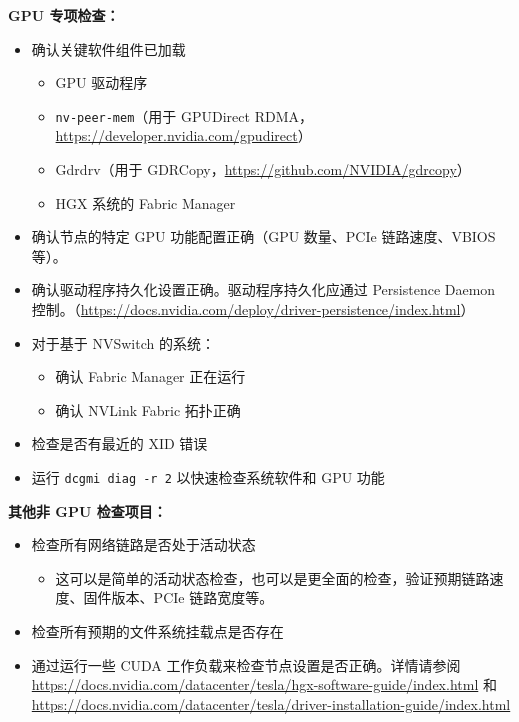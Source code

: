 \documentclass[11pt,UTF8,fontset=fandol,openany]{ctexrep}
\begin{document}
\vspace{0.5em}
\noindent\textbf{GPU 专项检查：}

\begin{itemize}
  \item 确认关键软件组件已加载
  \begin{itemize}
    \item GPU 驱动程序
    \item \texttt{nv-peer-mem}（用于 GPUDirect RDMA，\url{https://developer.nvidia.com/gpudirect}）
    \item Gdrdrv（用于 GDRCopy，\url{https://github.com/NVIDIA/gdrcopy}）
    \item HGX 系统的 Fabric Manager
  \end{itemize}
  \item 确认节点的特定 GPU 功能配置正确（GPU 数量、PCIe 链路速度、VBIOS 等）。
  \item 确认驱动程序持久化设置正确。驱动程序持久化应通过 Persistence Daemon 控制。（\url{https://docs.nvidia.com/deploy/driver-persistence/index.html}）
  \item 对于基于 NVSwitch 的系统：
  \begin{itemize}
    \item 确认 Fabric Manager 正在运行
    \item 确认 NVLink Fabric 拓扑正确
  \end{itemize}
  \item 检查是否有最近的 XID 错误
  \item 运行 \texttt{dcgmi diag -r 2} 以快速检查系统软件和 GPU 功能
\end{itemize}

\noindent\textbf{其他非 GPU 检查项目：}

\begin{itemize}
  \item 检查所有网络链路是否处于活动状态
  \begin{itemize}
    \item 这可以是简单的活动状态检查，也可以是更全面的检查，验证预期链路速度、固件版本、PCIe 链路宽度等。
  \end{itemize}
  \item 检查所有预期的文件系统挂载点是否存在
  \item 通过运行一些 CUDA 工作负载来检查节点设置是否正确。详情请参阅 \url{https://docs.nvidia.com/datacenter/tesla/hgx-software-guide/index.html} 和 \url{https://docs.nvidia.com/datacenter/tesla/driver-installation-guide/index.html}
\end{itemize}
\end{document}
